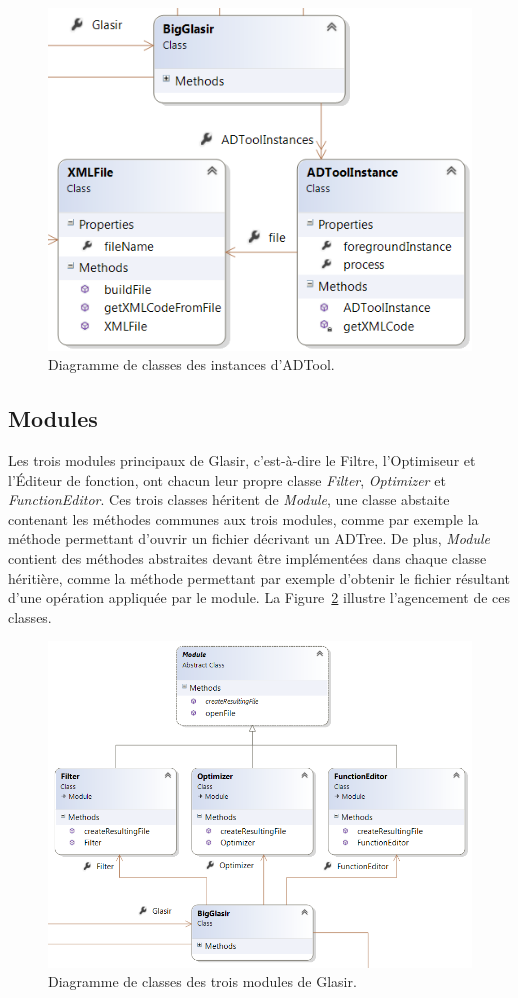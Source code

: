     	
    	\begin{figure}[H]
	        \centering
	        \includegraphics[height=0.5\textwidth]{figure/adtoolinstance.png}
	        \caption{Diagramme de classes des instances d'ADTool.}
	        \label{fig:instADT}
	    \end{figure}
	    


	\subsection{Modules}
    	\label{sec:diagClassMod}    	
    	
    	 Les trois modules principaux de Glasir, c'est-à-dire le Filtre, l'Optimiseur et l'Éditeur de fonction, ont chacun leur propre classe \emph{Filter}, \emph{Optimizer} et \emph{FunctionEditor}. Ces trois classes héritent de \emph{Module}, une classe abstaite contenant les méthodes communes aux trois modules, comme par exemple la méthode permettant d'ouvrir un fichier décrivant un ADTree. De plus, \emph{Module} contient des méthodes abstraites devant être implémentées dans chaque classe héritière, comme la méthode permettant par exemple d'obtenir le fichier résultant d'une opération appliquée par le module. La {\sc Figure}~\ref{fig:mod} illustre l'agencement de ces classes.
    	
    	
    	\begin{figure}[H]
	        \centering
	        \includegraphics[height=0.7\textwidth]{figure/modules.png}
	        \caption{Diagramme de classes des trois modules de Glasir.}
	        \label{fig:mod}
	    \end{figure}
	    
